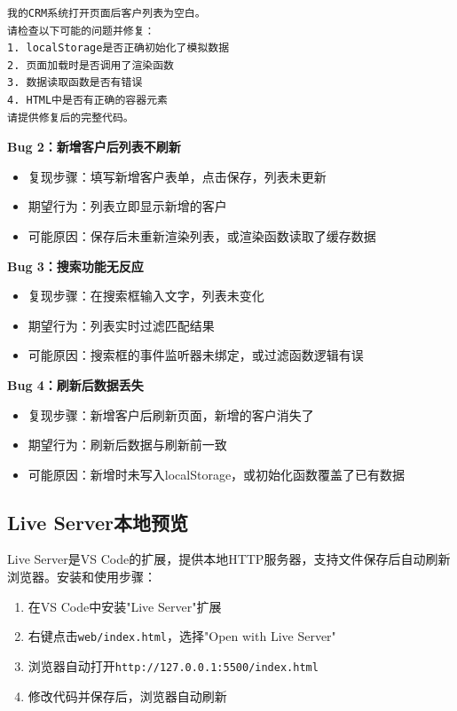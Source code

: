 \begin{lstlisting}
我的CRM系统打开页面后客户列表为空白。
请检查以下可能的问题并修复：
1. localStorage是否正确初始化了模拟数据
2. 页面加载时是否调用了渲染函数
3. 数据读取函数是否有错误
4. HTML中是否有正确的容器元素
请提供修复后的完整代码。
\end{lstlisting}

\textbf{Bug 2：新增客户后列表不刷新}
\begin{itemize}[leftmargin=2em]
  \item 复现步骤：填写新增客户表单，点击保存，列表未更新
  \item 期望行为：列表立即显示新增的客户
  \item 可能原因：保存后未重新渲染列表，或渲染函数读取了缓存数据
\end{itemize}

\textbf{Bug 3：搜索功能无反应}
\begin{itemize}[leftmargin=2em]
  \item 复现步骤：在搜索框输入文字，列表未变化
  \item 期望行为：列表实时过滤匹配结果
  \item 可能原因：搜索框的事件监听器未绑定，或过滤函数逻辑有误
\end{itemize}

\textbf{Bug 4：刷新后数据丢失}
\begin{itemize}[leftmargin=2em]
  \item 复现步骤：新增客户后刷新页面，新增的客户消失了
  \item 期望行为：刷新后数据与刷新前一致
  \item 可能原因：新增时未写入localStorage，或初始化函数覆盖了已有数据
\end{itemize}

\subsection{Live Server本地预览}

Live Server是VS Code的扩展，提供本地HTTP服务器，支持文件保存后自动刷新浏览器。安装和使用步骤：

\begin{enumerate}[leftmargin=2em]
  \item 在VS Code中安装"Live Server"扩展
  \item 右键点击\texttt{web/index.html}，选择"Open with Live Server"
  \item 浏览器自动打开\texttt{http://127.0.0.1:5500/index.html}
  \item 修改代码并保存后，浏览器自动刷新
\end{enumerate}

